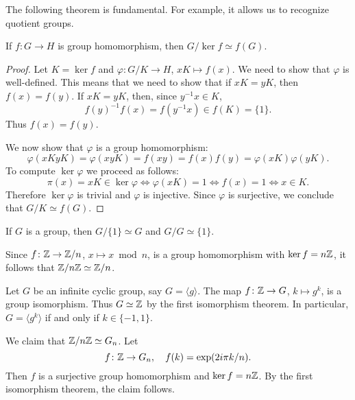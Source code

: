 
The following theorem is fundamental. For example, it allows us to recognize quotient groups. 

\begin{theorem}
If $f\colon G\to H$ is group homomorphism, then $G/\ker f\simeq f(G)$.
\end{theorem}

\begin{proof}
    Let $K=\ker f$ and $\varphi\colon G/K\to H$, $xK\mapsto f(x)$. We need to show that $\varphi$ is well-defined. This means that
    we need to show that if $xK=yK$, then $f(x)=f(y)$. If $xK=yK$, then, since $y^{-1}x\in K$, 
    \[
        f(y)^{-1}f(x)=f(y^{-1}x)\in f(K)=\{1\}.
    \]
    Thus $f(x)=f(y)$.

    We now show that $\varphi$ is a group homomorphism: 
        \[
        \varphi(xKyK)=\varphi(xyK)=f(xy)=f(x)f(y)=\varphi(xK)\varphi(yK).
        \]
    To compute $\ker\varphi$ we proceed as follows: 
        \[
        \pi(x)=xK\in\ker\varphi\Longleftrightarrow \varphi(xK)=1
        \Longleftrightarrow f(x)=1
        \Longleftrightarrow x\in K.
        \]
    Therefore  $\ker\varphi$ is trivial and
    $\varphi$ is injective. Since $\varphi$ is surjective, 
    we conclude that $G/K\simeq f(G)$.
\end{proof}

\begin{examples}
If $G$ is a group, then $G/\{1\}\simeq G$ and $G/G\simeq\{1\}$.
\end{examples}

\begin{example}
Since $f\colon\mathbb{Z}\to\mathbb{Z}/n$, $x\mapsto x\bmod n$, is a group homomorphism
with $\ker f=n\mathbb{Z}$, it follows that 
$\mathbb{Z}/n\mathbb{Z}\simeq\mathbb{Z}/n$.
\end{example}

\begin{example}
Let $G$ be an infinite cyclic group, say $G=\langle g\rangle$. The map 
$f \colon\mathbb{Z}\to G$, $k\mapsto g^k$,
is a group isomorphism. Thus $G\simeq\mathbb{Z}$ by the first isomorphism theorem. In particular, $G=\langle g^k\rangle$ if and only if 
 $k\in\{-1,1\}$.
\end{example}

\begin{example}
We claim that $\mathbb{Z}/n\mathbb{Z}\simeq G_n$. Let 
\[
f\colon\mathbb{Z}\to G_n,\quad
f(k)=\exp(2i\pi k/n).
\]
Then $f$ is a surjective group homomorphism and
$\ker f=n\mathbb{Z}$. By the first isomorphism theorem, the claim follows. 
\end{example}

